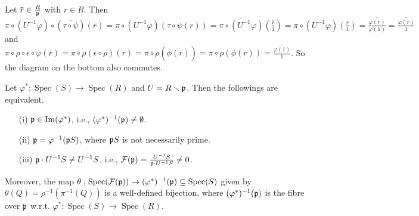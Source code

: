 \begin{construction}
\begin{center}
    \end{center}
    Let $\overbar{r} \in \frac{R}{\ffp}$ with $r \in R$. Then $\overbar{\pi \circ (U^{-1}\varphi)} \circ (\overbar{\tau \circ \psi})(\overbar{r}) = \overbar{\pi \circ (U^{-1}\varphi)}(\tau \circ \psi(r)) = \overbar{\pi \circ (U^{-1}\varphi)}\left(\overline{\frac{r}{1}}\right) = \pi \circ (U^{-1}\varphi)\left(\frac{r}{1}\right) = \overline{\frac{\varphi(r)}{\varphi(1)}} = \overline{\frac{\varphi(r)}{1}}$ and $\overbar{\pi \circ \rho} \circ \overbar{\epsilon \circ \varphi}(\overbar{r}) = \overbar{\pi \circ \rho}(\epsilon \circ \rho)(r) = \overbar{\pi \circ \rho}(\overbar{\phi(r)}) = \pi \circ \rho(\phi(r)) = \overline{\frac{\varphi(1)}{1}}$. So the diagram on the bottom also commutes.
\end{construction}

\begin{theorem}\label{3.24}
    Let $\varphi^*: \operatorname{Spec}(S) \to \operatorname{Spec}(R)$ and $U = R \smallsetminus \mathfrak{p}$. Then the followings are equivalent.
    \begin{enumerate}
        \item[(i)] $\mathfrak{p} \in \operatorname{Im}(\varphi^*)$, i.e., $(\varphi^*)^{-1}(\mathfrak{p}) \neq \emptyset$.
        \item[(ii)] $\mathfrak{p} = \varphi^{-1}(\mathfrak{p} S)$, where $\mathfrak{p} S$ is not necessarily prime.
        \item[(iii)] $\mathfrak{p} \cdot U^{-1}S \neq U^{-1}S$, i.e., $\mathcal{F}(\mathfrak{p}) = \frac{U^{-1}S}{\mathfrak{p} \cdot U^{-1}S} \neq 0$.
    \end{enumerate}
    Moreover, the map $\theta: \operatorname{Spec}(\mathcal{F}(\mathfrak{p})) \to (\varphi^*)^{-1}(\mathfrak{p}) \subseteq \operatorname{Spec}(S)$ given by $\theta(Q) = \rho^{-1}(\pi^{-1}(Q))$ is a well-defined bijection, where $(\varphi^{*})^{-1}(\mathfrak{p})$ is the fibre over $\mathfrak{p}$ w.r.t. $\varphi^{*}: \operatorname{Spec}(S) \to \operatorname{Spec}(R)$.
    \begin{center}
    \end{center}

\end{theorem}

